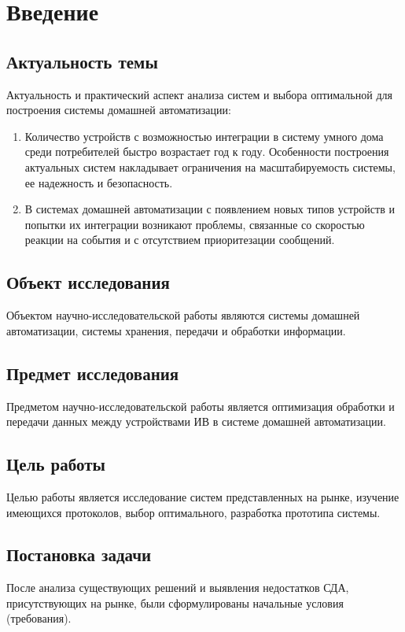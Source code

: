\documentclass[a4paper,12pt]{article}
\begin{document}
\tableofcontents

\newpage


\section{Введение}

\subsection{Актуальность темы}

Актуальность и практический аспект анализа систем и выбора оптимальной для построения системы домашней автоматизации:

\begin{enumerate}
    \item	Количество устройств с возможностью интеграции в систему умного дома среди потребителей быстро возрастает год к году. Особенности построения актуальных систем накладывает ограничения на масштабируемость системы, ее надежность и безопасность.
    \item	В системах домашней автоматизации с появлением новых типов устройств и попытки их интеграции возникают проблемы, связанные со скоростью реакции на события и с отсутствием приоритезации сообщений.
\end{enumerate}

\subsection{Объект исследования}
Объектом научно-исследовательской работы являются системы домашней автоматизации, системы хранения, передачи и обработки информации.

\subsection{Предмет исследования}
Предметом научно-исследовательской работы является оптимизация обработки и передачи данных между устройствами ИВ в системе домашней автоматизации.

\subsection{Цель работы}
Целью работы является исследование систем представленных на рынке, изучение имеющихся протоколов, выбор оптимального, разработка прототипа системы.

\subsection{Постановка задачи}
После анализа существующих решений и выявления недостатков СДА, присутствующих на рынке, были сформулированы начальные
условия (требования).
\end{document}

